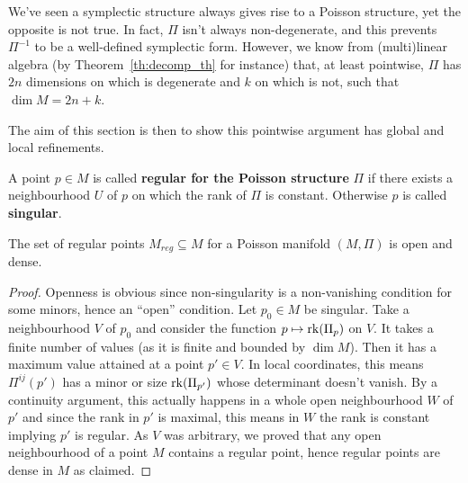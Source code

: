 We've seen a symplectic structure always gives rise to a Poisson structure, yet the opposite is not true. In fact, $\Pi$ isn't always non-degenerate, and this prevents $\Pi^{-1}$ to be a well-defined symplectic form. However, we know from (multi)linear algebra (by Theorem~\ref{th:decomp_th} for instance) that, at least pointwise, $\Pi$ has $2n$ dimensions on which is degenerate and $k$ on which is not, such that $\dim M = 2n+k$.

The aim of this section is then to show this pointwise argument has global and local refinements.

\begin{definition}
	A point $p \in M$ is called \textbf{regular for the Poisson structure} $\Pi$ if there exists a neighbourhood $U$ of $p$ on which the rank of $\Pi$ is constant. Otherwise $p$ is called \textbf{singular}.
\end{definition}

\begin{lemma}
	The set of regular points $M_{reg} \subseteq M$ for a Poisson manifold $(M, \Pi)$ is open and dense.
\end{lemma}
\begin{proof}
	Openness is obvious since non-singularity is a non-vanishing condition for some minors, hence an ``open'' condition. Let $p_0 \in M$ be singular. Take a neighbourhood $V$ of $p_0$ and consider the function $p \mapsto \operatorname{rk}(\Pi_p)$ on $V$. It takes a finite number of values (as it is finite and bounded by $\dim M$). Then it has a maximum value attained at a point $p' \in V$. In local coordinates, this means $\Pi^{ij}(p')$ has a minor or size $\operatorname{rk}(\Pi_{p'})$ whose determinant doesn't vanish. By a continuity argument, this actually happens in a whole open neighbourhood $W$ of $p'$ and since the rank in $p'$ is maximal, this means in $W$ the rank is constant implying $p'$ is regular. As $V$ was arbitrary, we proved that any open neighbourhood of a point $M$ contains a regular point, hence regular points are dense in $M$ as claimed.
\end{proof}

